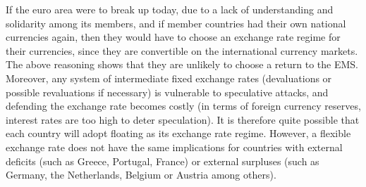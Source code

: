\documentclass[12pt]{article}
\begin{document}
If the euro area were to break up today, due to a lack of understanding and solidarity among its members, and if member countries had their own national currencies again, then they would have to choose an exchange rate regime for their currencies, since they are convertible on the international currency markets. The above reasoning shows that they are unlikely to choose a return to the EMS. Moreover, any system of intermediate fixed exchange rates (devaluations or possible revaluations if necessary) is vulnerable to speculative attacks, and defending the exchange rate becomes costly (in terms of foreign currency reserves, interest rates are too high to deter speculation). It is therefore quite possible that each country will adopt floating as its exchange rate regime. However, a flexible exchange rate does not have the same implications for countries with external deficits (such as Greece, Portugal, France) or external surpluses (such as Germany, the Netherlands, Belgium or Austria among others).
\end{document}
